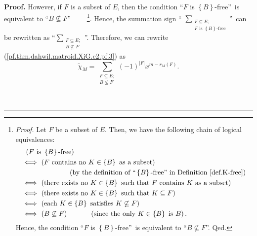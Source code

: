 \documentclass[numbers=enddot,12pt,final,onecolumn,notitlepage]{scrartcl}%
\theoremstyle{definition}
\newenvironment{proof}[1][Proof]{\noindent\textbf{#1.} }{\ \rule{0.5em}{0.5em}}
\newenvironment{verlong}{}{}
\let\sumnonlimits\sum
\renewcommand{\sum}{\sumnonlimits\limits}
\begin{document}
\begin{verlong}
\begin{proof}
However, if $F$ is a subset of $E$, then the condition \textquotedblleft$F$ is
$\left\{  B\right\}  $-free\textquotedblright\ is equivalent to
\textquotedblleft$B\not \subseteq F$\textquotedblright%
\ \ \ \ \footnote{\textit{Proof.} Let $F$ be a subset of $E$. Then, we have
the following chain of logical equivalences:%
\begin{align*}
&  \ \left(  F\text{ is }\left\{  B\right\}  \text{-free}\right) \\
&  \Longleftrightarrow\ \left(  F\text{ contains no }K\in\left\{  B\right\}
\text{ as a subset}\right) \\
&  \ \ \ \ \ \ \ \ \ \ \ \ \ \ \ \ \ \ \ \ \left(  \text{by the definition of
\textquotedblleft}\left\{  B\right\}  \text{-free\textquotedblright\ in
Definition \ref{def.K-free}}\right) \\
&  \Longleftrightarrow\ \left(  \text{there exists no }K\in\left\{  B\right\}
\text{ such that }F\text{ contains }K\text{ as a subset}\right) \\
&  \Longleftrightarrow\ \left(  \text{there exists no }K\in\left\{  B\right\}
\text{ such that }K\subseteq F\right) \\
&  \Longleftrightarrow\ \left(  \text{each }K\in\left\{  B\right\}  \text{
satisfies }K\not \subseteq F\right) \\
&  \Longleftrightarrow\ \left(  B\not \subseteq F\right)
\ \ \ \ \ \ \ \ \ \ \left(  \text{since the only }K\in\left\{  B\right\}
\text{ is }B\right)  .
\end{align*}
Hence, the condition \textquotedblleft$F$ is $\left\{  B\right\}
$-free\textquotedblright\ is equivalent to \textquotedblleft$B\not \subseteq
F$\textquotedblright. Qed.}. Hence, the summation sign \textquotedblleft%
$\sum_{\substack{F\subseteq E;\\F\text{ is }\left\{  B\right\}  \text{-free}%
}}$\textquotedblright\ can be rewritten as \textquotedblleft$\sum
_{\substack{F\subseteq E;\\B\not \subseteq F}}$\textquotedblright. Therefore,
we can rewrite (\ref{pf.thm.dahwil.matroid.XiG.c2.pf.3}) as%
\begin{equation}
\widetilde{\chi}_{M}=\sum_{\substack{F\subseteq E;\\B\not \subseteq F}}\left(
-1\right)  ^{\left\vert F\right\vert }x^{m-r_{M}\left(  F\right)  }.
\label{pf.thm.dahwil.matroid.XiG.c2.pf.4}%
\end{equation}



\end{proof}
\end{verlong}
\end{document}
